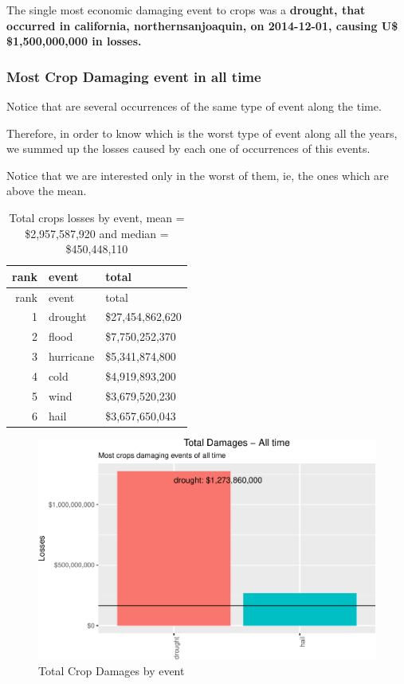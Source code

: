 \documentclass[]{article}
\begin{document}
The single most economic damaging event to crops was a \textbf{drought,
that occurred in california, northernsanjoaquin, on 2014-12-01, causing
U\$ \$1,500,000,000 in losses.}

\subsubsection{Most Crop Damaging event in all
time}\label{most-crop-damaging-event-in-all-time}

Notice that are several occurrences of the same type of event along the
time.

Therefore, in order to know which is the worst type of event along all
the years, we summed up the losses caused by each one of occurrences of
this events.

Notice that we are interested only in the worst of them, ie, the ones
which are above the mean.

\begin{longtable}[]{@{}rll@{}}
\caption{Total crops losses by event, mean = \$2,957,587,920 and median
= \$450,448,110}\tabularnewline
\toprule
rank & event & total\tabularnewline
\midrule
\endfirsthead
\toprule
rank & event & total\tabularnewline
\midrule
\endhead
1 & drought & \$27,454,862,620\tabularnewline
2 & flood & \$7,750,252,370\tabularnewline
3 & hurricane & \$5,341,874,800\tabularnewline
4 & cold & \$4,919,893,200\tabularnewline
5 & wind & \$3,679,520,230\tabularnewline
6 & hail & \$3,657,650,043\tabularnewline
\bottomrule
\end{longtable}

\begin{figure}[htbp]
\centering
\includegraphics{readme_files/figure-latex/crop-all-plot-1.pdf}
\caption{Total Crop Damages by event}
\end{figure}
\end{document}
